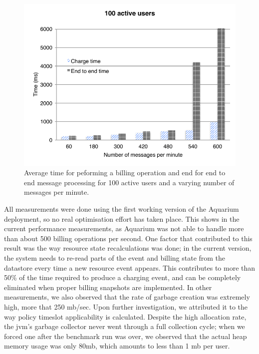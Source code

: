 \documentclass[preprint,10pt]{sigplanconf}
\begin{document}
\begin{figure}[t]
    \begin{center}
        \includegraphics[scale=0.63]{perf.pdf}
    \end{center}

    \caption{Average time for peforming a billing operation and end for end to
    end message processing for 100 active users and a varying number of
    messages per minute.}
    
    \label{fig:perf}
\end{figure}

All measurements were done using the first working version of the Aquarium
deployment, so no real optimisation effort has taken place. This shows in the
current performance measurements, as Aquarium was not able to handle more than
about 500 billing operations per second. One factor that contributed to this
result was the way resource state recalculations was done; in the current
version, the system needs to re-read parts of the event and billing state from
the datastore every time a new resource event appears. This contributes to more
than 50\% of the time required to produce a charging event, and can be
completely eliminated when proper billing snapshots are implemented. In other
measurements, we also observed that the rate of garbage creation was extremely
high, more that 250 {\sc mb}/sec. Upon further investigation, we attributed it
to the way policy timeslot applicability is calculated. Despite the high
allocation rate, the {\sc jvm}'s garbage collector never went through a
full collection cycle; when we forced one after the benchmark run was over, 
we observed that the actual heap memory usage was only 80{\sc mb}, which
amounts to less than 1 {\sc mb} per user.
\end{document}
